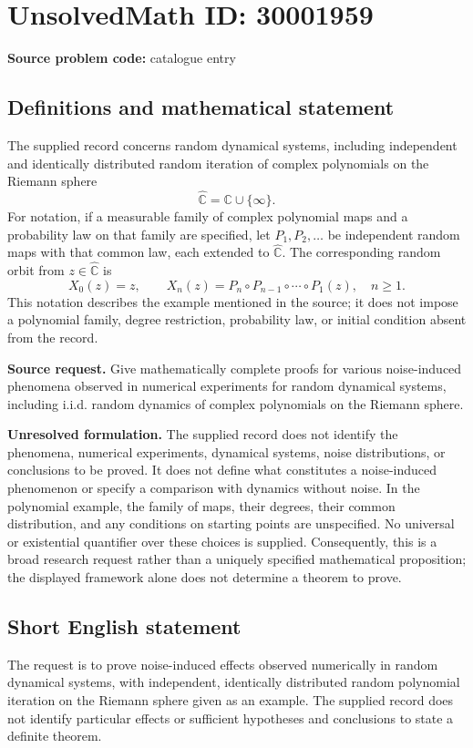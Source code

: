 \documentclass[11pt]{article}
\newcommand{\C}{\mathbb{C}}
\begin{document}
\section*{UnsolvedMath ID: 30001959}
\textbf{Source problem code:} catalogue entry
\subsection{Definitions and mathematical statement}
The supplied record concerns random dynamical systems, including independent and identically distributed random iteration of complex polynomials on the Riemann sphere
\[
\widehat{\C}=\C\cup\{\infty\}.
\]
For notation, if a measurable family of complex polynomial maps and a probability law on that family are specified, let \(P_1,P_2,\ldots\) be independent random maps with that common law, each extended to \(\widehat{\C}\). The corresponding random orbit from \(z\in\widehat{\C}\) is
\[
X_0(z)=z,\qquad X_n(z)=P_n\circ P_{n-1}\circ\cdots\circ P_1(z),\quad n\geq 1.
\]
This notation describes the example mentioned in the source; it does not impose a polynomial family, degree restriction, probability law, or initial condition absent from the record.

\textbf{Source request.} Give mathematically complete proofs for various noise-induced phenomena observed in numerical experiments for random dynamical systems, including i.i.d. random dynamics of complex polynomials on the Riemann sphere.

\textbf{Unresolved formulation.} The supplied record does not identify the phenomena, numerical experiments, dynamical systems, noise distributions, or conclusions to be proved. It does not define what constitutes a noise-induced phenomenon or specify a comparison with dynamics without noise. In the polynomial example, the family of maps, their degrees, their common distribution, and any conditions on starting points are unspecified. No universal or existential quantifier over these choices is supplied. Consequently, this is a broad research request rather than a uniquely specified mathematical proposition; the displayed framework alone does not determine a theorem to prove.
\subsection{Short English statement}
The request is to prove noise-induced effects observed numerically in random dynamical systems, with independent, identically distributed random polynomial iteration on the Riemann sphere given as an example. The supplied record does not identify particular effects or sufficient hypotheses and conclusions to state a definite theorem.
\end{document}
